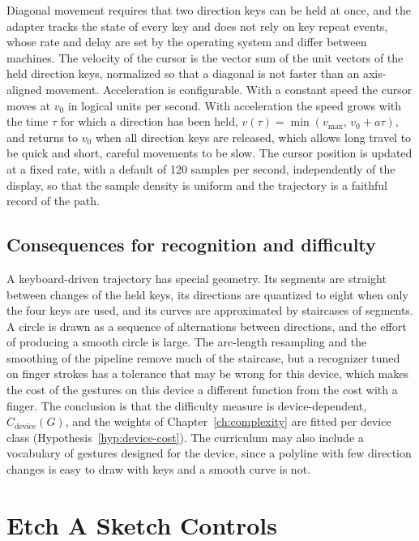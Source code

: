 Diagonal movement requires that two direction keys can be held at once, and the adapter tracks the state of every key and does not rely on key repeat events, whose rate and delay are set by the operating system and differ between machines.\evD{} The velocity of the cursor is the vector sum of the unit vectors of the held direction keys, normalized so that a diagonal is not faster than an axis-aligned movement. Acceleration is configurable. With a constant speed the cursor moves at $v_0$ in logical units per second. With acceleration the speed grows with the time $\tau$ for which a direction has been held, $v(\tau)=\min(v_{\max},\,v_0+a\tau)$, and returns to $v_0$ when all direction keys are released, which allows long travel to be quick and short, careful movements to be slow. The cursor position is updated at a fixed rate, with a default of 120 samples per second, independently of the display, so that the sample density is uniform and the trajectory is a faithful record of the path.

\section{Consequences for recognition and difficulty}

A keyboard-driven trajectory has special geometry. Its segments are straight between changes of the held keys, its directions are quantized to eight when only the four keys are used, and its curves are approximated by staircases of segments. A circle is drawn as a sequence of alternations between directions, and the effort of producing a smooth circle is large. The arc-length resampling and the smoothing of the pipeline remove much of the staircase, but a recognizer tuned on finger strokes has a tolerance that may be wrong for this device, which makes the cost of the gestures on this device a different function from the cost with a finger. The conclusion is that the difficulty measure is device-dependent, $C_{\text{device}}(G)$, and the weights of Chapter~\ref{ch:complexity} are fitted per device class (Hypothesis~\ref{hyp:device-cost}). The curriculum may also include a vocabulary of gestures designed for the device, since a polyline with few direction changes is easy to draw with keys and a smooth curve is not.

\chapter{Etch A Sketch Controls}\label{ch:etch}

